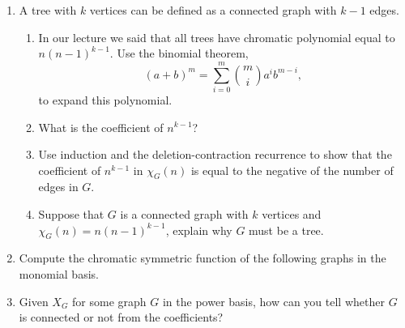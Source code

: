 \documentclass{article}
\begin{document}
\begin{enumerate}
\item A tree with $k$ vertices can be defined as a connected graph with $k-1$ edges. 
\begin{enumerate}
\item In our lecture we said that all trees have chromatic polynomial equal to $n(n-1)^{k-1}$.  Use the binomial theorem,
\[
(a+b)^m = \sum_{i=0}^m \binom{m}{i} a^ib^{m-i},
\]
to expand this polynomial. 
\item What is the coefficient of $n^{k-1}$? 
\item Use induction and the deletion-contraction recurrence to show that the coefficient of $n^{k-1}$ in $\chi_G(n)$ is equal to the negative of the number of edges in $G$. 
\item Suppose that $G$ is a connected graph with $k$ vertices and $\chi_G(n) = n(n-1)^{k-1}$, explain why $G$ must be a tree. 
\end{enumerate}

\item Compute the chromatic symmetric function of the following graphs in the monomial basis. 

\begin{center}
\hskip 1in
\end{center}
\item Given $X_G$ for some graph $G$ in the power basis, how can you tell whether $G$ is connected or not from the coefficients?  


\end{enumerate}
\end{document}
